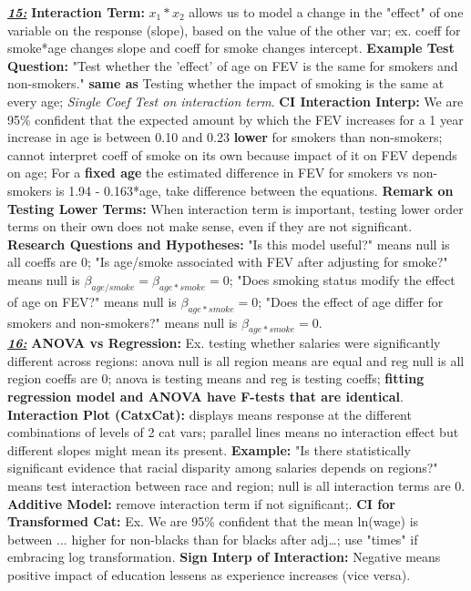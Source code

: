 \documentclass[8pt]{extarticle}
\begin{document}
\textit{\textbf{\underline{15:}}}
\textbf{Interaction Term:} $x_1*x_2$ allows us to model a change in the "effect" 
of one variable on the response (slope), based on the value of the other var;
ex. coeff for smoke*age changes slope and coeff for smoke changes intercept.
\textbf{Example Test Question:} "Test whether the 'effect' of age on FEV is the 
same for smokers and non-smokers." \textbf{same as} Testing whether the impact 
of smoking is the same at every age; \textit{Single Coef Test on interaction term}.
\textbf{CI Interaction Interp:} We are 95\% confident that the expected amount 
by which the FEV increases for a 1 year increase in age is between 0.10 and 0.23
\textbf{lower} for smokers than non-smokers; cannot interpret coeff of smoke 
on its own because impact of it on FEV depends on age; For a \textbf{fixed age} 
the estimated difference in FEV for smokers vs non-smokers is 1.94 - 0.163*age, 
take difference between the equations.
\textbf{Remark on Testing Lower Terms:} When interaction term is important, 
testing lower order terms on their own does not make sense, even if they are not 
significant.
\textbf{Research Questions and Hypotheses:} "Is this model useful?" means 
null is all coeffs are 0; "Is age/smoke associated with FEV after adjusting for
smoke?" means null is $\beta_{age/smoke} = \beta_{age*smoke} = 0$; "Does 
smoking status modify the effect of age on FEV?" means null is $\beta_{age*smoke}
= 0$; "Does the effect of age differ for smokers and non-smokers?" means null is
$\beta_{age*smoke} = 0$.\\

\textit{\textbf{\underline{16:}}}
\textbf{ANOVA vs Regression:} Ex. testing whether salaries were significantly 
different across regions: anova null is all region means are equal and reg null 
is all region coeffs are 0; anova is testing means and reg is testing coeffs; 
\textbf{fitting regression model and ANOVA have F-tests that are identical}.
\textbf{Interaction Plot (CatxCat):} displays means response at the different 
combinations of levels of 2 cat vars; parallel lines means no interaction 
effect but different slopes might mean its present.
\textbf{Example:} "Is there statistically significant evidence that racial 
disparity among salaries depends on regions?" means test interaction between 
race and region; null is all interaction terms are 0.
\textbf{Additive Model:} remove interaction term if not significant;.
\textbf{CI for Transformed Cat:} Ex. We are 95\% confident that the mean 
ln(wage) is between ... higher for non-blacks than for blacks after adj\dots;
use "times" if embracing log transformation.
\textbf{Sign Interp of Interaction:} Negative means positive impact of education 
lessens as experience increases (vice versa).\\
\end{document}
